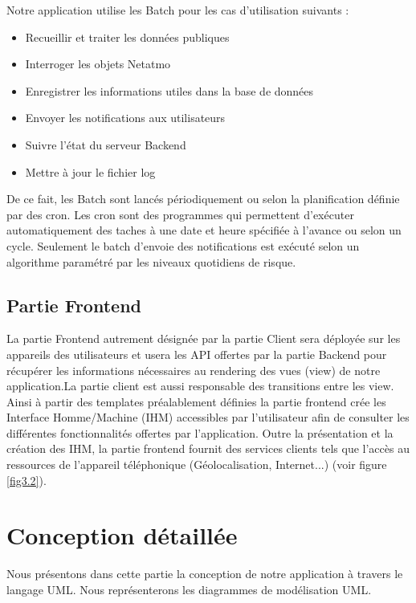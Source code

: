 Notre application utilise les Batch pour les cas d'utilisation suivants :
\begin{itemize}
	\item Recueillir et traiter les données publiques
	\item Interroger les objets Netatmo
	\item Enregistrer les informations utiles dans la base de données
	\item Envoyer les notifications aux utilisateurs
	\item Suivre l'état du serveur Backend
	\item Mettre à jour le fichier log
\end{itemize}

De ce fait, les Batch sont lancés périodiquement ou selon la planification définie par des cron. Les cron sont des programmes qui permettent d'exécuter automatiquement des taches à une date et heure spécifiée à l'avance ou selon un cycle. Seulement le batch d'envoie des notifications est exécuté selon un algorithme paramétré par les niveaux quotidiens de risque.


\subsection{Partie Frontend}

\qquad La partie Frontend autrement désignée par la partie Client sera déployée sur les appareils des utilisateurs et usera les API offertes par la partie Backend pour récupérer les informations nécessaires au rendering des vues (view) de notre application.La partie client est aussi responsable des transitions entre les view. Ainsi à partir des templates préalablement définies la partie frontend crée les Interface Homme/Machine (IHM)  accessibles par l'utilisateur afin de consulter les différentes fonctionnalités offertes par l'application. Outre la présentation et la création des IHM, la partie frontend fournit des services clients tels que l'accès au ressources de l'appareil téléphonique (Géolocalisation, Internet...) (voir figure \ref{fig3.2}).

\section{Conception détaillée}

\qquad Nous présentons dans cette partie la conception de notre application à travers le langage UML. Nous représenterons les diagrammes de modélisation UML.

